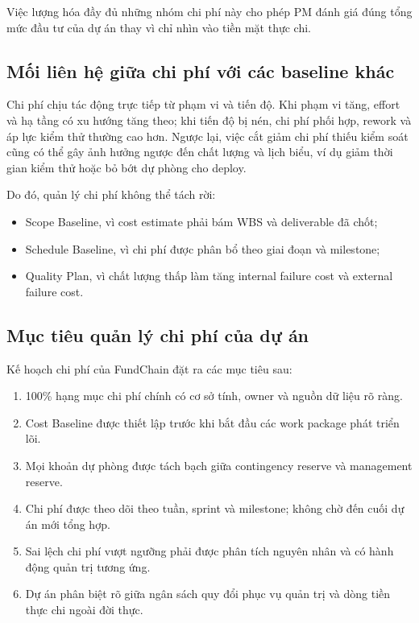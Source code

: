 Việc lượng hóa đầy đủ những nhóm chi phí này cho phép PM đánh giá đúng tổng mức đầu tư của dự án thay vì chỉ nhìn vào tiền mặt thực chi.

\subsection{Mối liên hệ giữa chi phí với các baseline khác}

Chi phí chịu tác động trực tiếp từ phạm vi và tiến độ. Khi phạm vi tăng, effort và hạ tầng có xu hướng tăng theo; khi tiến độ bị nén, chi phí phối hợp, rework và áp lực kiểm thử thường cao hơn. Ngược lại, việc cắt giảm chi phí thiếu kiểm soát cũng có thể gây ảnh hưởng ngược đến chất lượng và lịch biểu, ví dụ giảm thời gian kiểm thử hoặc bỏ bớt dự phòng cho deploy.

Do đó, quản lý chi phí không thể tách rời:

\begin{itemize}
  \item Scope Baseline, vì cost estimate phải bám WBS và deliverable đã chốt;
  \item Schedule Baseline, vì chi phí được phân bổ theo giai đoạn và milestone;
  \item Quality Plan, vì chất lượng thấp làm tăng internal failure cost và external failure cost.
\end{itemize}

\subsection{Mục tiêu quản lý chi phí của dự án}

Kế hoạch chi phí của FundChain đặt ra các mục tiêu sau:

\begin{enumerate}
  \item 100\% hạng mục chi phí chính có cơ sở tính, owner và nguồn dữ liệu rõ ràng.
  \item Cost Baseline được thiết lập trước khi bắt đầu các work package phát triển lõi.
  \item Mọi khoản dự phòng được tách bạch giữa contingency reserve và management reserve.
  \item Chi phí được theo dõi theo tuần, sprint và milestone; không chờ đến cuối dự án mới tổng hợp.
  \item Sai lệch chi phí vượt ngưỡng phải được phân tích nguyên nhân và có hành động quản trị tương ứng.
  \item Dự án phân biệt rõ giữa ngân sách quy đổi phục vụ quản trị và dòng tiền thực chi ngoài đời thực.
\end{enumerate}

